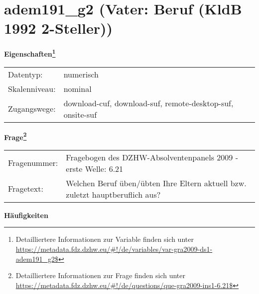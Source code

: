 
    \setcounter{footnote}{0}

    \vspace*{-1.8cm}
	\section{adem191\_g2 (Vater: Beruf (KldB 1992 2-Steller))}
	\label{section:adem191_g2}



    \vspace*{0.5cm}
    \noindent\textbf{Eigenschaften\footnote{Detailliertere Informationen zur Variable finden sich unter
		\url{https://metadata.fdz.dzhw.eu/\#!/de/variables/var-gra2009-ds1-adem191_g2$}}}\\
	\begin{tabularx}{\hsize}{@{}lX}
	Datentyp: & numerisch \\
	Skalenniveau: & nominal \\
	Zugangswege: &
	  download-cuf, 
	  download-suf, 
	  remote-desktop-suf, 
	  onsite-suf
 \\
    \end{tabularx}



				\vspace*{0.5cm}
                \noindent\textbf{Frage\footnote{Detailliertere Informationen zur Frage finden sich unter
		              \url{https://metadata.fdz.dzhw.eu/\#!/de/questions/que-gra2009-ins1-6.21$}}}\\
				\begin{tabularx}{\hsize}{@{}lX}
					Fragenummer: &
					  Fragebogen des DZHW-Absolventenpanels 2009 - erste Welle:
					  6.21
 \\
					Fragetext: & Welchen Beruf üben/übten Ihre Eltern aktuell bzw. zuletzt hauptberuflich aus? \\
				\end{tabularx}





        		\vspace*{0.5cm}
                \noindent\textbf{Häufigkeiten}

